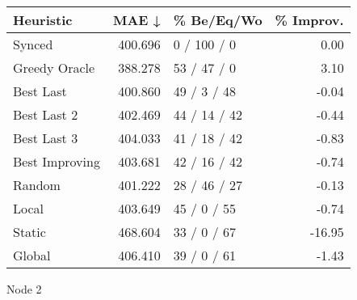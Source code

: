\begin{tabular}{lrlr}
\toprule
\textbf{Heuristic} & \textbf{MAE ↓} & \textbf{\% Be/Eq/Wo} & \textbf{\% Improv.} \\
\midrule
            Synced &        400.696 &          0 / 100 / 0 &                0.00 \\
     Greedy Oracle &        388.278 &          53 / 47 / 0 &                3.10 \\
         Best Last &        400.860 &          49 / 3 / 48 &               -0.04 \\
       Best Last 2 &        402.469 &         44 / 14 / 42 &               -0.44 \\
       Best Last 3 &        404.033 &         41 / 18 / 42 &               -0.83 \\
    Best Improving &        403.681 &         42 / 16 / 42 &               -0.74 \\
            Random &        401.222 &         28 / 46 / 27 &               -0.13 \\
             Local &        403.649 &          45 / 0 / 55 &               -0.74 \\
            Static &        468.604 &          33 / 0 / 67 &              -16.95 \\
            Global &        406.410 &          39 / 0 / 61 &               -1.43 \\
\bottomrule
\end{tabular}
\caption{Node 2}
\label{tab:iid_lr05_le2_bs2_2}
